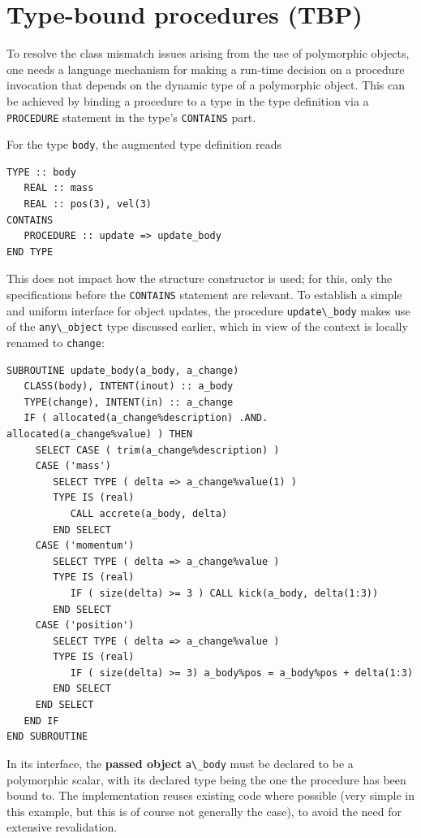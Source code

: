 \documentclass[
  paper=a4,
  ,captions=tableheading
]{scrartcl}
\newcommand{\passthrough}[1]{#1}
\begin{document}
\section{Type-bound procedures (TBP)}\label{sec:tbp}

To resolve the class mismatch issues arising from the use of polymorphic
objects, one needs a language mechanism for making a run-time decision
on a procedure invocation that depends on the dynamic type of a
polymorphic object. This can be achieved by binding a procedure to a
type in the type definition via a \passthrough{\lstinline!PROCEDURE!}
statement in the type's \passthrough{\lstinline!CONTAINS!} part.

For the type \passthrough{\lstinline!body!}, the augmented type
definition reads

\begin{lstlisting}
TYPE :: body
   REAL :: mass
   REAL :: pos(3), vel(3)
CONTAINS
   PROCEDURE :: update => update_body
END TYPE
\end{lstlisting}

This does not impact how the structure constructor is used; for this,
only the specifications before the \passthrough{\lstinline!CONTAINS!}
statement are relevant. To establish a simple and uniform interface for
object updates, the procedure \passthrough{\lstinline!update\_body!}
makes use of the \passthrough{\lstinline!any\_object!} type discussed
earlier, which in view of the context is locally renamed to
\passthrough{\lstinline!change!}:

\begin{lstlisting}
SUBROUTINE update_body(a_body, a_change)
   CLASS(body), INTENT(inout) :: a_body
   TYPE(change), INTENT(in) :: a_change
   IF ( allocated(a_change%description) .AND. allocated(a_change%value) ) THEN
     SELECT CASE ( trim(a_change%description) )
     CASE ('mass')
        SELECT TYPE ( delta => a_change%value(1) )
        TYPE IS (real)
           CALL accrete(a_body, delta)
        END SELECT
     CASE ('momentum')
        SELECT TYPE ( delta => a_change%value )
        TYPE IS (real)
           IF ( size(delta) >= 3 ) CALL kick(a_body, delta(1:3))
        END SELECT
     CASE ('position')
        SELECT TYPE ( delta => a_change%value )
        TYPE IS (real)
           IF ( size(delta) >= 3) a_body%pos = a_body%pos + delta(1:3)
        END SELECT
     END SELECT
   END IF
END SUBROUTINE
\end{lstlisting}

In its interface, the \textbf{passed object}
\passthrough{\lstinline!a\_body!} must be declared to be a polymorphic
scalar, with its declared type being the one the procedure has been
bound to. The implementation reuses existing code where possible (very
simple in this example, but this is of course not generally the case),
to avoid the need for extensive revalidation.
\end{document}
